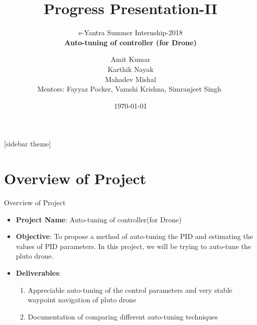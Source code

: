 \documentclass[10pt, a4paper]{beamer}
\begin{document}
	\title{Progress Presentation-II}
	\subtitle{e-Yantra Summer Internship-2018 \\ $ $\textbf{Auto-tuning of controller (for Drone)}$ $}
	\author{$ $Amit Kumar$ $\\$ $Karthik Nayak$ $\\$ $Mahadev Mishal$ $\\
	Mentors: $ $Fayyaz Pocker, Vamshi Krishna, Simranjeet Singh  $ $}
	\date{\today}
	\frame{\titlepage}

[sidebar theme]
\section{Overview of Project}
\begin{frame}{Overview of Project}
	\begin{itemize}
		\item \textbf{Project Name}:  Auto-tuning of controller(for Drone)\\\vspace{1em}
		\item \textbf{Objective}: To propose a method of auto-tuning the PID and estimating the values of PID parameters. In this project, we will be trying to auto-tune the pluto drone.\\\vspace{1em}
		\item \textbf{Deliverables}: \begin{enumerate}
				\item Appreciable auto-tuning of the control parameters and very stable waypoint navigation of pluto drone 
				\item Documentation of comparing different auto-tuning techniques
				\end{enumerate}
	\end{itemize}
\end{frame}
\end{document}
